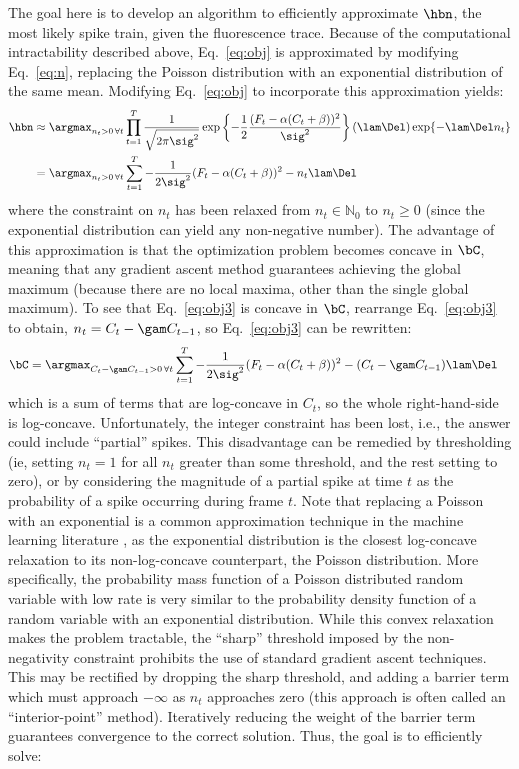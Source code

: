 The goal here is to develop an algorithm to efficiently approximate $\hbn$, the most likely spike train, given the fluorescence trace. Because of the computational intractability described above, Eq.~\eqref{eq:obj} is approximated by modifying Eq.~\eqref{eq:n}, replacing the Poisson distribution with an exponential distribution of the same mean. Modifying Eq.~\eqref{eq:obj} to incorporate this approximation yields:
\begin{subequations}
\begin{align} \label{eq:obj2}
\hbn &\approx \argmax_{n_t>0 \, \forall t} \prod_{t=1}^T  \frac{1}{\sqrt{2 \pi \sig^2}} \exp \left\{-\frac{1}{2}\frac{(F_t - \alpha (C_t + \beta))^2}{\sig^2}\right\}  (\lam\Del) \exp\{-\lam\Del n_t\}
\\ &= \argmax_{n_t>0 \, \forall t}  \sum_{t=1}^T -\frac{1}{2 \sig^2}(F_t - \alpha(C_t + \beta))^2  - n_t \lam \Del  \label{eq:obj3}
\end{align}
\end{subequations}
where the constraint on $n_t$ has been relaxed from  $n_t \in \mathbb{N}_0$ to $n_t \geq 0$ (since the exponential distribution can yield any non-negative number).  The advantage of this approximation is that the optimization problem becomes concave in $\bC$, meaning that any gradient ascent method guarantees achieving the global maximum (because there are no local maxima, other than the single global maximum).  To see that Eq.~\eqref{eq:obj3} is concave in $\bC$, rearrange Eq.~\eqref{eq:obj3} to obtain, $n_t=C_t-\gam C_{t-1}$, so Eq.~\eqref{eq:obj3} can be rewritten:
\begin{align}
\bC &= \argmax_{C_t-\gam C_{t-1}>0 \, \forall t}  \sum_{t=1}^T -\frac{1}{2 \sig^2}(F_t - \alpha(C_t + \beta))^2  - (C_t -\gam C_{t-1}) \lam \Del  \label{eq:obj3}
\end{align}
\noindent which is a sum of terms that are log-concave in $C_t$, so the whole right-hand-side is log-concave. Unfortunately, the integer constraint has been lost, i.e.,  the answer could include ``partial'' spikes.  This disadvantage can be remedied by thresholding (ie, setting $n_t=1$ for all $n_t$ greater than some threshold, and the rest setting to zero), or by considering the magnitude of a partial spike at time $t$ as the probability of a spike occurring during frame $t$. Note that replacing a Poisson with an exponential is a common approximation technique in the machine learning literature \cite{CONV04, PaninskiWu09}, as the exponential distribution is the closest log-concave relaxation to its non-log-concave counterpart, the Poisson distribution. More specifically, the probability mass function of a Poisson distributed random variable with low rate is very similar to the probability density function of a random variable with an exponential distribution. While this convex relaxation makes the problem tractable, the ``sharp'' threshold imposed by the non-negativity constraint prohibits the use of standard gradient ascent techniques. This may be rectified by dropping the sharp threshold, and adding a barrier term which must approach $-\infty$ as $n_t$ approaches zero (this approach is often called an ``interior-point'' method). Iteratively reducing the weight of the barrier term guarantees convergence to the correct solution.  Thus, the goal is to efficiently solve:
